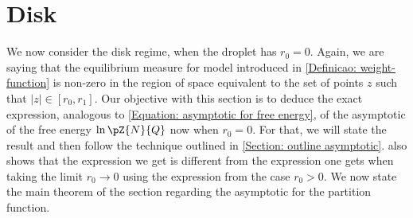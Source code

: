 \section{Disk}
\label{Subsection: Disk}

We now  consider the disk regime, when the droplet has $r_0 = 0$. Again, we are saying that the equilibrium measure for model introduced in \autoref{Definicao: weight-function} is non-zero in the region of space equivalent to the set of points $z$ such that $|z| \in [r_0, r_1]$. Our objective with this section is to deduce the exact expression, analogous to \eqref{Equation: asymptotic for free energy}, of the asymptotic of the free energy $\ln{\pZ{N}{Q}}$ now when $r_0 = 0$. For that, we will state the result and then follow the technique outlined in \autoref{Section: outline asymptotic}.  also shows that the expression we get is different from the expression one gets when taking the limit $r_0 \rightarrow 0$ using the expression from the case $r_0 > 0$. We now state the main theorem of the section regarding the asymptotic for the partition function. 

